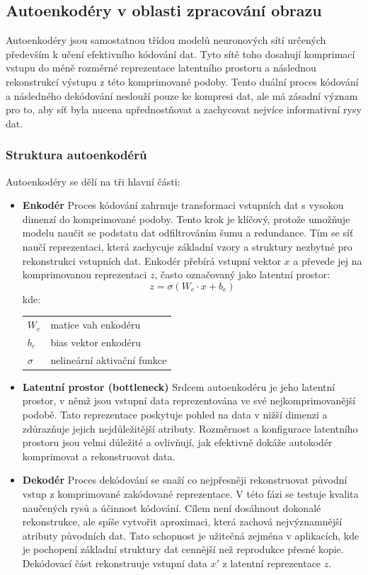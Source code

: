 \documentclass[male,czech,api_ing]{thesis}
\makeatletter
\newenvironment{conditions}[1][kde:]
    {#1 \begin{tabular}[t]{>{$}l<{$} @{${}={}$} >{\raggedright\arraybackslash}p{10cm}}}
    {\end{tabular}}
\makeatother
\begin{document}
\subsection{Autoenkodéry v oblasti zpracování obrazu}
Autoenkodéry jsou samostatnou třídou modelů neuronových sítí určených především k učení efektivního kódování dat. Tyto sítě toho dosahují komprimací vstupu do méně rozměrné reprezentace latentního prostoru a následnou rekonstrukcí výstupu z této komprimované podoby. Tento duální proces kódování a následného dekódování neslouží pouze ke kompresi dat, ale má zásadní význam pro to, aby síť byla nucena upřednostňovat a zachycovat nejvíce informativní rysy dat.

\subsubsection{Struktura autoenkodérů}
Autoenkodéry se dělí na tři hlavní části:

\begin{itemize}
    \item \textbf{Enkodér} Proces kódování zahrnuje transformaci vstupních dat s vysokou dimenzí do komprimované podoby. Tento krok je klíčový, protože umožňuje modelu naučit se podstatu dat odfiltrováním šumu a redundance. Tím se síť naučí reprezentaci, která zachycuje základní vzory a struktury nezbytné pro rekonstrukci vstupních dat. Enkodér přebírá vstupní vektor $x$ a převede jej na komprimovanou reprezentaci $z$, často označovaný jako latentní prostor:
    \begin{equation}
        z = \sigma(W_e \cdot x + b_e)
    \end{equation}
    \begin{conditions}
        W_e & matice vah enkodéru \\
        b_e & bias vektor enkodéru \\
        \sigma & nelineární aktivační funkce
    \end{conditions}
    \item \textbf{Latentní prostor (bottleneck)} Srdcem autoenkodéru je jeho latentní prostor, v němž jsou vstupní data reprezentována ve své nejkomprimovanější podobě. Tato reprezentace poskytuje pohled na data v nižší dimenzi a zdůrazňuje jejich nejdůležitější atributy. Rozměrnost a konfigurace latentního prostoru jsou velmi důležité a ovlivňují, jak efektivně dokáže autokodér komprimovat a rekonstruovat data.
    \item \textbf{Dekodér} Proces dekódování se snaží co nejpřesněji rekonstruovat původní vstup z komprimované zakódované reprezentace. V této fázi se testuje kvalita naučených rysů a účinnost kódování. Cílem není dosáhnout dokonalé rekonstrukce, ale spíše vytvořit aproximaci, která zachová nejvýznamnější atributy původních dat. Tato schopnost je užitečná zejména v aplikacích, kde je pochopení základní struktury dat cennější než reprodukce přesné kopie. Dekódovací část rekonstruuje vstupní data $x'$ z latentní reprezentace $z$.
\end{itemize}
\end{document}
